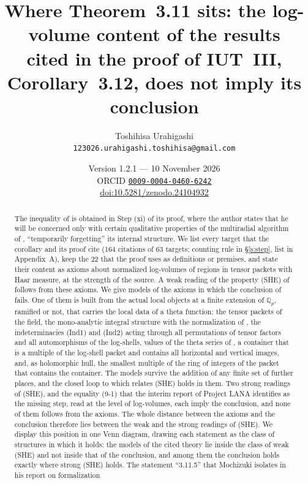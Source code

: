 \documentclass[11pt]{article}
\title{Where Theorem~3.11 sits: the log-volume content of the results\\
cited in the proof of IUT~III, Corollary~3.12, does not imply its conclusion}
\author{Toshihisa Urahigashi\\
\small\texttt{123026.urahigashi.toshihisa@gmail.com}}
\date{Version 1.2.1 --- 10 November 2026\\[3pt]
\small ORCID \href{https://orcid.org/0009-0004-0460-6242}{\texttt{0009-0004-0460-6242}}\\
\small \href{https://doi.org/10.5281/zenodo.24104932}{doi:10.5281/zenodo.24104932}}
\theoremstyle{plain}
\theoremstyle{definition}
\theoremstyle{remark}
\begin{document}
\maketitle

\begin{abstract}
The inequality of \cite[Cor.~3.12]{IUT3} is obtained in Step (xi) of its proof, where the
author states that he will be concerned only with certain qualitative properties of the
multiradial algorithm of \cite[Thm.~3.11]{IUT3}, ``temporarily forgetting'' its internal
structure. We list every
target that the corollary and its proof cite (164 citations of 63 targets; counting rule
in \S\ref{s:step}, list in Appendix~A), keep the 22
that the proof uses as
definitions or premises, and state their content as axioms about normalized log-volumes of
regions in tensor packets with Haar measure, at the strength of the source. A weak
reading of the property (SHE) of \cite[Rem.~3.11.1(iii)]{IUT3} follows from these axioms.
We give models of the axioms in which the conclusion of \cite[Cor.~3.12]{IUT3} fails.
One of them is built from the actual local objects at a finite extension of $\mathbb Q_p$,
ramified or not, that carries the local data of a theta function: the tensor packets of
the field, the mono-analytic
integral structure with the normalization of \cite[Prop.~1.4(i)]{IUT4}, the
indeterminacies (Ind1) and (Ind2) acting through all permutations of tensor factors and
all automorphisms of the log-shells, values of the theta series of \cite[Prop.~1.4]{EtTh},
a container that is a multiple of the log-shell packet and contains all horizontal and
vertical images, and, as holomorphic hull, the smallest multiple of the ring of integers of
the packet that contains the container.
The models survive the addition of any finite set of further places, and the closed loop
to which \cite[Rem.~3.11.1(iii)]{IUT3} relates (SHE) holds in them. Two strong readings of
(SHE), and the equality (9-1) that the interim report of Project LANA \cite{LANA}
identifies as the missing step, read at the level of log-volumes,
each imply the conclusion, and none of them follows from the axioms. The whole distance
between the axioms and the conclusion therefore lies
between the weak and the strong readings of (SHE). We display this position in one Venn
diagram, drawing each statement as the class of structures in which it holds: the models
of the cited theory lie inside the class of weak (SHE) and not inside that of the
conclusion, and among them the conclusion holds exactly where strong (SHE) holds. The
statement ``3.11.5'' that Mochizuki isolates in his report on formalization

\end{abstract}
\end{document}
